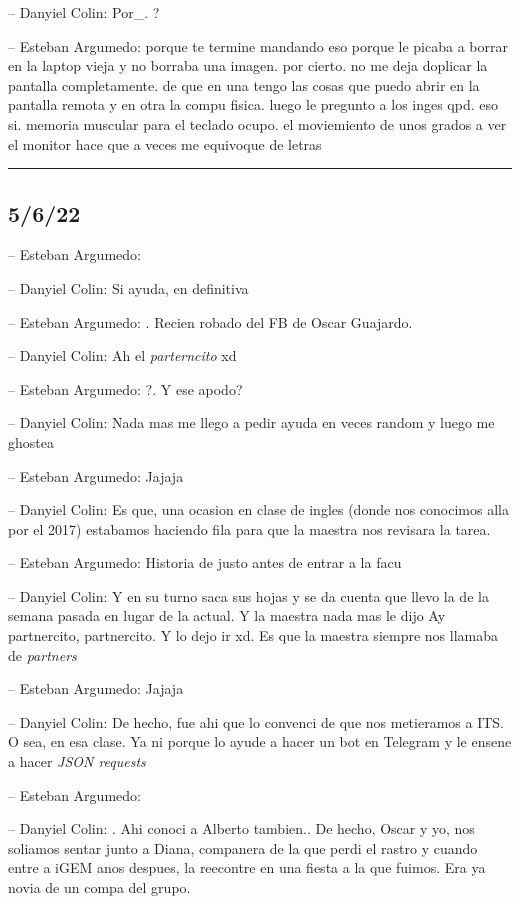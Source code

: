 -- Danyiel Colin: Por\_. ?

-- Esteban Argumedo: porque te termine mandando eso porque le picaba a
borrar en la laptop vieja y no borraba una imagen. por cierto. no me
deja doplicar la pantalla completamente. de que en una tengo las cosas
que puedo abrir en la pantalla remota y en otra la compu fisica. luego
le pregunto a los inges qpd. eso si. memoria muscular para el teclado
ocupo. el moviemiento de unos grados a ver el monitor hace que a veces
me equivoque de letras

\begin{center}\rule{0.5\linewidth}{0.5pt}\end{center}

\hypertarget{section-70}{%
\subsection{5/6/22}\label{section-70}}

-- Esteban Argumedo:

-- Danyiel Colin: Si ayuda, en definitiva

-- Esteban Argumedo: . Recien robado del FB de Oscar Guajardo.

-- Danyiel Colin: Ah el \emph{parterncito} xd

-- Esteban Argumedo: ?. Y ese apodo?

-- Danyiel Colin: Nada mas me llego a pedir ayuda en veces random y
luego me ghostea

-- Esteban Argumedo: Jajaja

-- Danyiel Colin: Es que, una ocasion en clase de ingles (donde nos
conocimos alla por el 2017) estabamos haciendo fila para que la maestra
nos revisara la tarea.

-- Esteban Argumedo: Historia de justo antes de entrar a la facu

-- Danyiel Colin: Y en su turno saca sus hojas y se da cuenta que llevo
la de la semana pasada en lugar de la actual. Y la maestra nada mas le
dijo Ay partnercito, partnercito. Y lo dejo ir xd. Es que la maestra
siempre nos llamaba de \emph{partners}

-- Esteban Argumedo: Jajaja

-- Danyiel Colin: De hecho, fue ahi que lo convenci de que nos
metieramos a ITS. O sea, en esa clase. Ya ni porque lo ayude a hacer un
bot en Telegram y le ensene a hacer \emph{JSON requests}

-- Esteban Argumedo:

-- Danyiel Colin: . Ahi conoci a Alberto tambien.. De hecho, Oscar y yo,
nos soliamos sentar junto a Diana, companera de la que perdi el rastro y
cuando entre a iGEM anos despues, la reecontre en una fiesta a la que
fuimos. Era ya novia de un compa del grupo.

